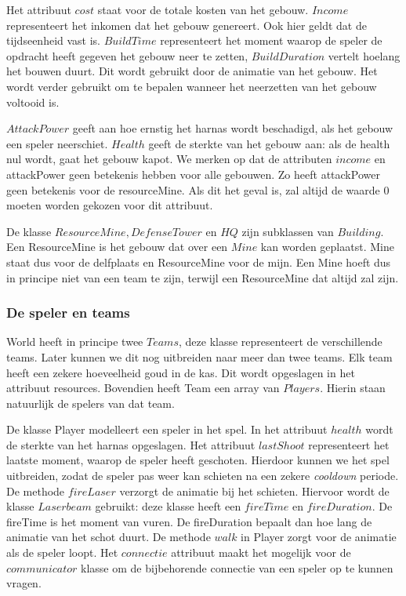 \documentclass[a4paper,11pt]{article}
\begin{document}
Het attribuut $cost$ staat voor de totale kosten van het gebouw. $Income$ representeert het inkomen dat het gebouw genereert. Ook hier geldt dat de tijdseenheid vast is. $BuildTime$ representeert het moment waarop de speler de opdracht heeft gegeven het gebouw neer te zetten, $BuildDuration$ vertelt hoelang het bouwen duurt. Dit wordt gebruikt door de animatie van het gebouw. Het wordt verder gebruikt om te bepalen wanneer het neerzetten van het gebouw voltooid is.

$AttackPower$ geeft aan hoe ernstig het harnas wordt beschadigd, als het gebouw een speler neerschiet. $Health$ geeft de sterkte van het gebouw aan: als de health nul wordt, gaat het gebouw kapot. We merken op dat de attributen $income$ en attackPower geen betekenis hebben voor alle gebouwen. Zo heeft attackPower geen betekenis voor de resourceMine. Als dit het geval is, zal altijd de waarde 0 moeten worden gekozen voor dit attribuut.

De klasse $ResourceMine, DefenseTower$ en $HQ$ zijn subklassen van $Building$. Een ResourceMine is het gebouw dat over een $Mine$ kan worden geplaatst. Mine staat dus voor de delfplaats en ResourceMine voor de mijn. Een Mine hoeft dus in principe niet van een team te zijn, terwijl een ResourceMine dat altijd zal zijn.

\subsubsection{De speler en teams}
World heeft in principe twee $Teams$, deze klasse representeert de verschillende teams. Later kunnen we dit nog uitbreiden naar meer dan twee teams. Elk team heeft een zekere hoeveelheid goud in de kas. Dit wordt opgeslagen in het attribuut resources. Bovendien heeft Team een array van $Players$. Hierin staan natuurlijk de spelers van dat team.

De klasse Player modelleert een speler in het spel. In het attribuut $health$ wordt de sterkte van het harnas opgeslagen. Het attribuut $lastShoot$ representeert het laatste moment, waarop de speler heeft geschoten. Hierdoor kunnen we het spel uitbreiden, zodat de speler pas weer kan schieten na een zekere \emph{cooldown} periode. De methode $fireLaser$ verzorgt de animatie bij het schieten. Hiervoor wordt de klasse $Laserbeam$ gebruikt: deze klasse heeft een $fireTime$ en $fireDuration$. De fireTime is het moment van vuren. De fireDuration bepaalt dan hoe lang de animatie van het schot duurt. De methode $walk$ in Player zorgt voor de animatie als de speler loopt. Het $connectie$ attribuut maakt het mogelijk voor de $communicator$ klasse om de bijbehorende connectie van een speler op te kunnen vragen.
\end{document}
